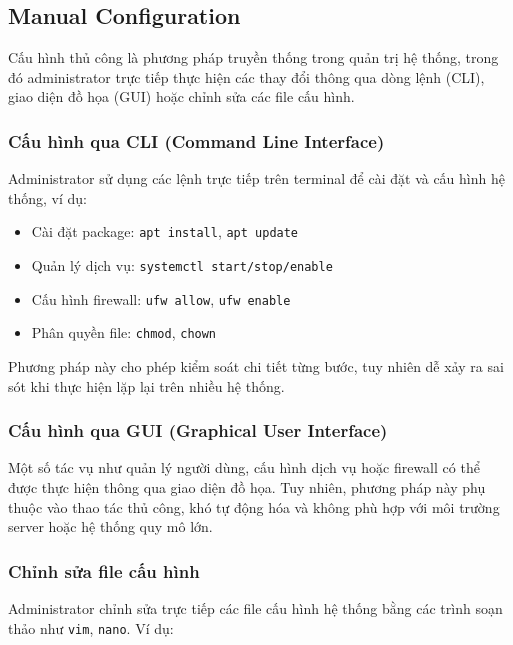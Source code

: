 \subsection{Manual Configuration}

\noindent Cấu hình thủ công là phương pháp truyền thống trong quản trị hệ thống, trong đó administrator trực tiếp thực hiện các thay đổi thông qua dòng lệnh (CLI), giao diện đồ họa (GUI) hoặc chỉnh sửa các file cấu hình.

\subsubsection{Cấu hình qua CLI (Command Line Interface)}

\noindent Administrator sử dụng các lệnh trực tiếp trên terminal để cài đặt và cấu hình hệ thống, ví dụ:

\begin{itemize}
\item Cài đặt package: \texttt{apt install}, \texttt{apt update}
\item Quản lý dịch vụ: \texttt{systemctl start/stop/enable}
\item Cấu hình firewall: \texttt{ufw allow}, \texttt{ufw enable}
\item Phân quyền file: \texttt{chmod}, \texttt{chown}
\end{itemize}

\noindent Phương pháp này cho phép kiểm soát chi tiết từng bước, tuy nhiên dễ xảy ra sai sót khi thực hiện lặp lại trên nhiều hệ thống.

\subsubsection{Cấu hình qua GUI (Graphical User Interface)}

\noindent Một số tác vụ như quản lý người dùng, cấu hình dịch vụ hoặc firewall có thể được thực hiện thông qua giao diện đồ họa. Tuy nhiên, phương pháp này phụ thuộc vào thao tác thủ công, khó tự động hóa và không phù hợp với môi trường server hoặc hệ thống quy mô lớn.

\subsubsection{Chỉnh sửa file cấu hình}

\noindent Administrator chỉnh sửa trực tiếp các file cấu hình hệ thống bằng các trình soạn thảo như \texttt{vim}, \texttt{nano}. Ví dụ:

